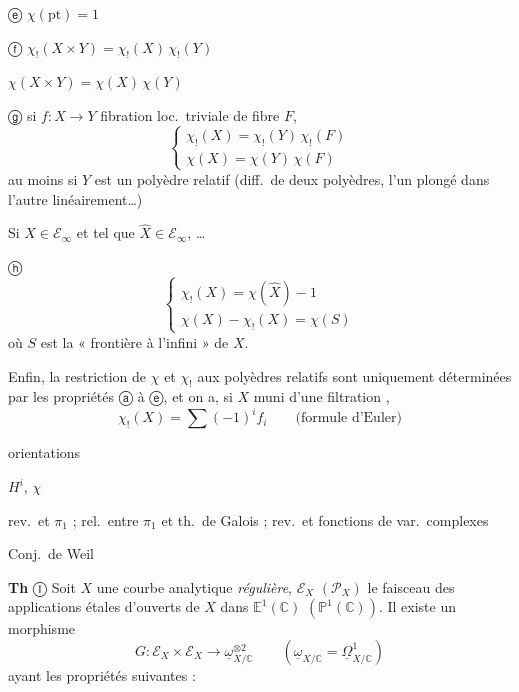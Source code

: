\documentclass[11pt,a4paper]{article}
\begin{document}
ⓔ $\chi(\mathrm{pt}) = 1$

ⓕ $\chi_!(X \times Y) = \chi_!(X)\,\chi_!(Y)$

$\chi(X \times Y) = \chi(X)\,\chi(Y)$

ⓖ si $f : X \to Y$ fibration loc.\ triviale de fibre $F$,
\[
\begin{cases} \chi_!(X) = \chi_!(Y)\,\chi_!(F) \\ \chi(X) = \chi(Y)\,\chi(F) \end{cases}
\]
 au moins si $Y$ est un polyèdre relatif (diff.\ de deux polyèdres, l'un plongé dans l'autre linéairement…)

Si $X \in \mathcal{E}_\infty$ et tel que $\hat{X} \in \mathcal{E}_\infty$, …

ⓗ
\[
\begin{cases} \chi_!(X) = \chi(\hat{X}) - 1 \\ \chi(X) - \chi_!(X) = \chi(S) \end{cases}
\]
où $S$ est la « frontière à l'infini » de $X$.

Enfin, la restriction de  $\chi$ et $\chi_!$ aux polyèdres relatifs sont uniquement déterminées par les propriétés ⓐ à ⓔ, et on a, si $X$ muni d'une filtration \ill{},
\[
\chi_!(X) = \sum (-1)^i f_i \qquad \text{(formule d'Euler)}
\]


orientations


$H^i$, $\chi$

rev.\ et $\pi_1$ ;
rel.\ entre $\pi_1$ et th.\ de Galois ;
rev.\ et fonctions de var.\ complexes

Conj.\ de Weil


\textbf{Th} Ⓘ Soit $X$ une courbe analytique \emph{régulière}, $\mathcal{E}_X$ $(\mathcal{P}_X)$ le faisceau des applications étales d'ouverts de $X$ dans $\mathbb{E}^1(\mathbb{C})$ $(\mathbb{P}^1(\mathbb{C}))$. Il existe un morphisme
\[
G : \mathcal{E}_X \times \mathcal{E}_X \longrightarrow \underline{\omega}_{X/\mathbb{C}}^{\otimes 2} \qquad (\underline{\omega}_{X/\mathbb{C}} = \underline{\Omega}^1_{X/\mathbb{C}})
\]
ayant les propriétés suivantes :
\end{document}
